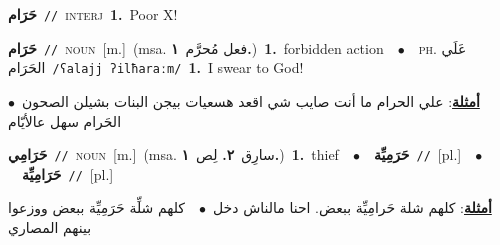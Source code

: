\documentclass[10pt,a4paper,twoside]{article} %
\begin{document}
\begin{multicols}{2}
{\setlength\topsep{0pt}\textbf{\foreignlanguage{arabic}{حَرَام}}\ {\color{gray}\texttt{//}\color{black}}\ \textsc{interj}\ \textbf{1.}~Poor X!\ } \vspace{2mm}

{\setlength\topsep{0pt}\textbf{\foreignlanguage{arabic}{حَرَام}}\ {\color{gray}\texttt{//}\color{black}}\ \textsc{noun}\ [m.]\ \color{gray}(msa. \foreignlanguage{arabic}{فعل مُحرَّم}~\foreignlanguage{arabic}{\textbf{١.}})\color{black}\ \textbf{1.}~forbidden action\ \ $\bullet$\ \ \textsc{ph.} \color{gray} \foreignlanguage{arabic}{عَلَي الحَرَام}\color{black}\ {\color{gray}\texttt{/{\sffamily ʕalajj ʔilħaraːm}/}\color{black}}\ \textbf{1.}~I swear to God!\  \begin{flushright}\color{gray}\foreignlanguage{arabic}{\textbf{\underline{\foreignlanguage{arabic}{أمثلة}}}: علي الحرام ما أنت صايب شي اقعد هسعيات بيجن البنات بشيلن الصحون\ $\bullet$\ \  الحَرام سهل عالأيّام}\end{flushright}\color{black}} \vspace{2mm}

{\setlength\topsep{0pt}\textbf{\foreignlanguage{arabic}{حَرَامِي}}\ {\color{gray}\texttt{//}\color{black}}\ \textsc{noun}\ [m.]\ \color{gray}(msa. \foreignlanguage{arabic}{سارِق}~\foreignlanguage{arabic}{\textbf{٢.}}  \foreignlanguage{arabic}{لِص}~\foreignlanguage{arabic}{\textbf{١.}})\color{black}\ \textbf{1.}~thief\ \ $\bullet$\ \ \setlength\topsep{0pt}\textbf{\foreignlanguage{arabic}{حَرَمِيِّة}}\ {\color{gray}\texttt{//}\color{black}}\ [pl.]\ \ $\bullet$\ \ \setlength\topsep{0pt}\textbf{\foreignlanguage{arabic}{حَرَامِيِّة}}\ {\color{gray}\texttt{//}\color{black}}\ [pl.]\  \begin{flushright}\color{gray}\foreignlanguage{arabic}{\textbf{\underline{\foreignlanguage{arabic}{أمثلة}}}: كلهم شلة حَرامِيِّة ببعض. احنا مالناش دخل\ $\bullet$\ \  كلهم شلِّة حَرَمِيِّة ببعض ووزعوا بينهم المصاري}\end{flushright}\color{black}} \vspace{2mm}


\end{multicols}
\end{document}
